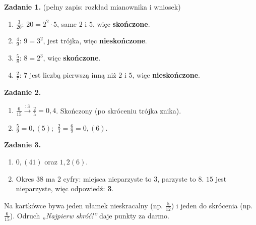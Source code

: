 \documentclass[11pt,a4paper]{article}
\begin{document}

\vspace{0.6em}
\textbf{Zadanie 1.} (pełny zapis: rozkład mianownika i wniosek)
\begin{enumerate}[label=\alph*), leftmargin=*, itemsep=4pt]
  \item $\frac{3}{20}$: $20=2^2\cdot 5$, same $2$ i $5$, więc \textbf{skończone}.
  \item $\frac{4}{9}$: $9=3^2$, jest trójka, więc \textbf{nieskończone}.
  \item $\frac{5}{8}$: $8=2^3$, więc \textbf{skończone}.
  \item $\frac{2}{7}$: $7$ jest liczbą pierwszą inną niż $2$ i $5$, więc \textbf{nieskończone}.
\end{enumerate}

\textbf{Zadanie 2.}
\begin{enumerate}[label=\alph*), leftmargin=*, itemsep=4pt]
  \item $\frac{6}{15}\xrightarrow{:3}\frac{2}{5}=0{,}4$. Skończony (po skróceniu trójka znika).
  \item $\frac{5}{9}=0{,}(5)$; $\ \frac{2}{3}=\frac{6}{9}=0{,}(6)$.
\end{enumerate}

\textbf{Zadanie 3.}
\begin{enumerate}[label=\alph*), leftmargin=*, itemsep=4pt]
  \item $0{,}(41)$ oraz $1{,}2(6)$.
  \item Okres $38$ ma 2 cyfry: miejsca nieparzyste to $3$, parzyste to $8$. $15$ jest nieparzyste, więc odpowiedź: \textbf{3}.
\end{enumerate}

\vspace{0.6em}
\begin{tcolorbox}[colback=white, colframe=okres, boxrule=0.6pt, arc=2pt, title=Wskazówka dla Pawła]
Na kartkówce bywa jeden ułamek nieskracalny (np. $\frac{5}{12}$) i jeden do skrócenia (np. $\frac{6}{15}$). Odruch \emph{„Najpierw skróć!”} daje punkty za darmo.
\end{tcolorbox}
\end{document}
